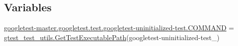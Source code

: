 \subsection*{Variables}
\begin{DoxyCompactItemize}
\item 
\mbox{\hyperlink{namespacegoogletest-master_1_1googletest_1_1test_1_1googletest-uninitialized-test_abdc655624c6be49a767d6f61a400db1b}{googletest-\/master.\+googletest.\+test.\+googletest-\/uninitialized-\/test.\+C\+O\+M\+M\+A\+ND}} = \mbox{\hyperlink{namespacegtest__test__utils_a89ed3717984a80ffbb7a9c92f71b86a2}{gtest\+\_\+test\+\_\+utils.\+Get\+Test\+Executable\+Path}}(\textquotesingle{}googletest-\/uninitialized-\/test\+\_\+\textquotesingle{})
\end{DoxyCompactItemize}
